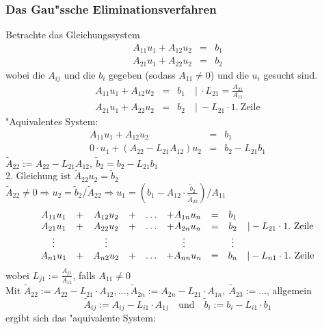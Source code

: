 \documentclass{scrartcl}
\begin{document}
\subsubsection{Das Gau"ssche Eliminationsverfahren}
 Betrachte das Gleichungssystem
\begin{eqnarray*}
A_{11} u_1 + A_{12} u_2 & = & b_1 \\
A_{21} u_1 + A_{22} u_2 & = & b_2
\end{eqnarray*}
wobei die $A_{ij}$ und die $b_i$ gegeben (sodass $A_{11} \neq 0$) und die $u_i$ gesucht sind.
\begin{eqnarray*}
A_{11} u_1 + A_{12} u_2 & = & b_1  \quad \vert \ \cdot L_{21} = \frac{A_{21}}{A_{11}} \\
A_{21} u_1 + A_{22} u_2 & = & b_2  \quad \vert \ - L_{21} \cdot \mathrm{1. \ Zeile}
\end{eqnarray*}
"Aquivalentes System:
\begin{eqnarray*}
A_{11} u_1 + A_{12} u_2 & = & b_1 \\
0 \cdot u_1 + (A_{22} - L_{21} A_{12} ) u_2 & = & b_2 - L_{21} b_1
\end{eqnarray*}
$\tilde{A}_{22} := A_{22} - L_{21} A_{12}, \ \tilde{b}_2 = b_2 - L_{21} b_1$ \\
2. Gleichung ist $\tilde{A}_{22} u_2 = \tilde{b}_2$ \\
$\tilde{A}_{22} \neq 0 \Rightarrow u_2 = \tilde{b}_2 / \tilde{A}_{22} \Rightarrow u_1 = (b_1 - A_{12} \cdot \frac{\tilde{b}_2}{\tilde{A}_{22}}) / A_{11} $
 \\
$$
\begin{array}{c c c c c c c c c }
A_{11} u_1 & + &A_{12} u_2 & + & \ldots & + A_{1n} u_n & = & b_1 \\
A_{21} u_1 & + &A_{22} u_2 & + & \ldots & + A_{2n} u_n & = & b_2 & \vert - L_{21} \cdot \mathrm{1. \ Zeile} \\
\vdots & & \vdots & & & \vdots  & &  \vdots \\
A_{n1} u_1 & + &A_{n2} u_2 & + & \ldots & + A_{nn} u_n & = & b_n & \vert - L_{n1} \cdot \mathrm{1. \ Zeile}
\end{array}
$$
wobei $L_{j1} := \frac{A_{j1}}{A_{11}}$, falls $A_{11} \neq 0$ \\
Mit $\tilde{A}_{22} := A_{22} - L_{21} \cdot A_{12}, \ldots, \tilde{A}_{2n} := A_{2n} - L_{21} \cdot A_{1n}, \ \tilde{A}_{23} := \ldots$, allgemein
$$\tilde A_{ij} := A_{ij} - L_{i1} \cdot A_{1j} \quad \mathrm{und} \quad \tilde b_i := b_i - L_{i1} \cdot b_1$$ ergibt sich das "aquivalente System:
\end{document}
